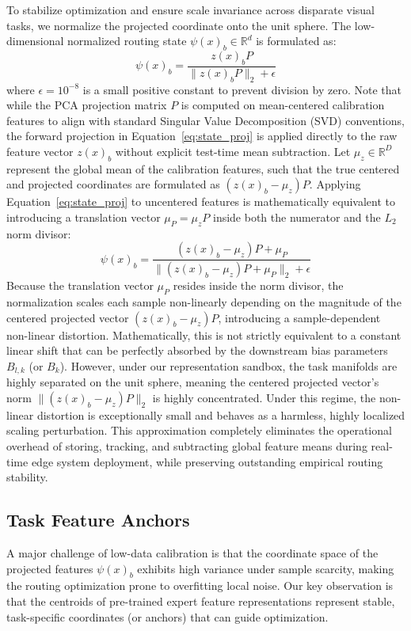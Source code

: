 To stabilize optimization and ensure scale invariance across disparate visual tasks, we normalize
the projected coordinate onto the unit sphere. The low-dimensional normalized routing state
$\psi(x)_b \in \mathbb{R}^d$ is formulated as:
\begin{equation}
\psi(x)_b = \frac{z(x)_b P}{\|z(x)_b P\|_2 + \epsilon}
\label{eq:state_proj}
\end{equation}
where $\epsilon = 10^{-8}$ is a small positive constant to prevent division by zero. Note that
while the PCA projection matrix $P$ is computed on mean-centered calibration features to align with
standard Singular Value Decomposition (SVD) conventions, the forward projection in
Equation~\ref{eq:state_proj} is applied directly to the raw feature vector $z(x)_b$ without explicit
test-time mean subtraction. Let $\mu_z \in \mathbb{R}^D$ represent the global mean of the
calibration features, such that the true centered and projected coordinates are formulated as
$(z(x)_b - \mu_z)P$. Applying Equation~\ref{eq:state_proj} to uncentered features is mathematically
equivalent to introducing a translation vector $\mu_P = \mu_z P$ inside both the numerator and the
$L_2$ norm divisor:
\begin{equation}
\psi(x)_b = \frac{(z(x)_b - \mu_z) P + \mu_P}{\|(z(x)_b - \mu_z) P + \mu_P\|_2 + \epsilon}
\label{eq:uncentered_proj_approx}
\end{equation}
Because the translation vector $\mu_P$ resides inside the norm divisor, the normalization scales
each sample non-linearly depending on the magnitude of the centered projected vector
$(z(x)_b - \mu_z) P$, introducing a sample-dependent non-linear distortion. Mathematically, this is
not strictly equivalent to a constant linear shift that can be perfectly absorbed by the downstream
bias parameters $B_{l,k}$ (or $B_k$). However, under our representation sandbox, the task manifolds
are highly separated on the unit sphere, meaning the centered projected vector's norm
$\|(z(x)_b - \mu_z) P\|_2$ is highly concentrated. Under this regime, the non-linear distortion is
exceptionally small and behaves as a harmless, highly localized scaling perturbation. This
approximation completely eliminates the operational overhead of storing, tracking, and subtracting
global feature means during real-time edge system deployment, while preserving outstanding
empirical routing stability.

\subsection{Task Feature Anchors}
A major challenge of low-data calibration is that the coordinate space of the projected features
$\psi(x)_b$ exhibits high variance under sample scarcity, making the routing optimization prone to
overfitting local noise. Our key observation is that the centroids of pre-trained expert feature
representations represent stable, task-specific coordinates (or anchors) that can guide
optimization.

